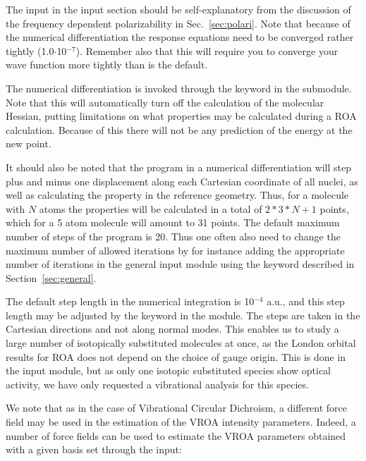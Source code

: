 The input in the  input section should be
self-explanatory from the discussion of the frequency dependent
polarizability in Sec.~\ref{sec:polari}. Note
that because of the numerical differentiation the response equations need to be converged 
rather tightly (1.0$\cdot$10$^{-7}$). Remember also that this will
require you to converge your wave function more
tightly than is the default. 

The numerical differentiation is
invoked through the keyword 
 in the  submodule. Note that this will
automatically 
turn off the calculation of the molecular Hessian,
putting limitations 
on what properties may be calculated during a ROA calculation. Because
of this there will not be any prediction of the energy at the new
point.

It should also be noted that the program in a numerical differentiation will
step plus and minus one displacement along each Cartesian
coordinate
of all nuclei, as well as calculating the property in the reference
geometry. Thus, for a molecule with $N$ atoms the properties will be
calculated in a total of $2*3*N + 1$ points, which for a 5 atom 
molecule will amount to 31 points. The default maximum number of steps
of the program is 20. Thus one often also need to
change the maximum number of allowed iterations by for instance
adding the appropriate number of iterations in the general input
module using the keyword  described in
Section~\ref{sec:general}.

The default step length in the numerical integration is 10$^{-4}$
a.u., and this step length may be adjusted by the keyword
 in the  module. The steps are taken in
the Cartesian directions and 
not along normal modes. This enables us to study a
large number of 
isotopically substituted molecules at
once, as the London orbital 
results for ROA does not depend on the choice of gauge origin. This is
done in the  input module, but as only one isotopic
substituted species show optical activity, we have only requested a
vibrational analysis for this species.

We note that as in the case of Vibrational Circular Dichroism, a different
force field may be used in the estimation of the VROA intensity
parameters. Indeed, a number of force fields can be used to estimate
the VROA parameters obtained with a given basis set through the input:

